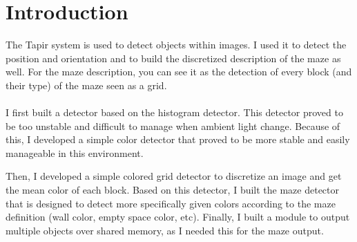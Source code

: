 \section{Introduction}

The Tapir system is used to detect objects within images. I used 
it to detect the \khepera{} position and orientation and to build the 
discretized description of the maze as well. For the maze description, 
you can see it as the detection of every block (and their type) of the 
maze seen as a grid.
\\
\\
I first built a detector based on the histogram detector. This detector 
proved to be too unstable and difficult to manage when ambient light 
change. Because of this, I developed a simple color detector that 
proved to be more stable and easily manageable in this environment. 

Then, I developed a simple colored grid detector to discretize an image 
and get the mean color of each block. Based on this detector, I built 
the maze detector that is designed to detect more specifically given 
colors according to the maze definition (wall color, empty space color, 
etc). Finally, I built a module to output multiple objects over shared 
memory, as I needed this for the maze output.
